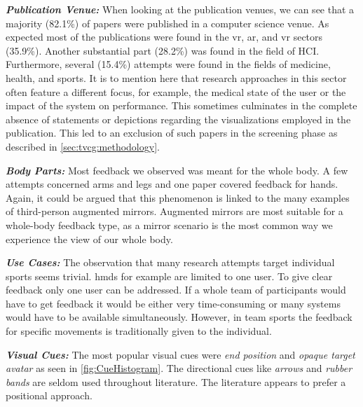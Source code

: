 \textbf{\emph{Publication Venue:}} When looking at the publication venues, we can see that a majority (82.1\%) of papers were published in a computer science venue. As expected most of the publications were found in the \acrshort{vr}, \acrshort{ar}, and \acrshort{vr} sectors (35.9\%). Another substantial part (28.2\%) was found in the field of HCI. Furthermore, several (15.4\%) attempts were found in the fields of medicine, health, and sports. It is to mention here that research approaches in this sector often feature a different focus, for example, the medical state of the user or the impact of the system on performance. This sometimes culminates in the complete absence of statements or depictions regarding the visualizations employed in the publication. This led to an exclusion of such papers in the screening phase as described in \autoref{sec:tvcg:methodology}.

\textbf{\emph{Body Parts:}} Most feedback we observed was meant for the whole body. A few attempts concerned arms and legs and one paper covered feedback for hands. Again, it could be argued that this phenomenon is linked to the many examples of third-person augmented mirrors. Augmented mirrors are most suitable for a whole-body feedback type, as a mirror scenario is the most common way we experience the view of our whole body.

\textbf{\emph{Use Cases:}} The observation that many research attempts target individual sports seems trivial. \acrshort{hmd}s for example are limited to one user. To give clear feedback only one user can be addressed. If a whole team of participants would have to get feedback it would be either very time-consuming or many systems would have to be available simultaneously. However, in team sports the feedback for specific movements is traditionally given to the individual.

\textbf{\emph{Visual Cues:}} The most popular visual cues were \emph{end position} and \emph{opaque target avatar} as seen in \autoref{fig:CueHistogram}. The directional cues like \emph{arrows} and \emph{rubber bands} are seldom used throughout literature. The literature appears to prefer a positional approach.

